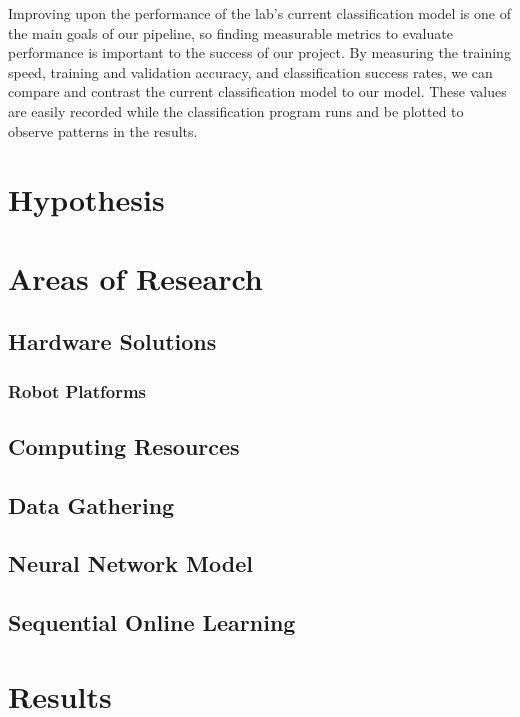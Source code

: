 \documentclass[journal]{IEEEtran}
\begin{document}
	Improving upon the performance of the lab's current classification model is one of the main goals of our pipeline, so finding measurable metrics to evaluate performance is important to the success of our project. By measuring the training speed, training and validation accuracy, and classification success rates, we can compare and contrast the current classification model to our model. These values are easily recorded while the classification program runs and be plotted to observe patterns in the results. 
\section{Hypothesis}	
\section{Areas of Research}
	\subsection{Hardware Solutions}  
	 	\subsubsection{Robot Platforms}
	 	\subsection{Computing Resources}
	\subsection{Data Gathering}
	\subsection{Neural Network Model}
	\subsection{Sequential Online Learning}
  
\section{Results} 
\end{document}
